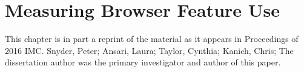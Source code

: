 \chapter{Measuring Browser Feature Use}
\label{measurement}

This chapter is in part a reprint of the material as it appears in
Proceedings of 2016 IMC. Snyder, Peter; Ansari, Laura; Taylor,
Cynthia; Kanich, Chris; The dissertation author was the primary investigator and
author of this paper.






